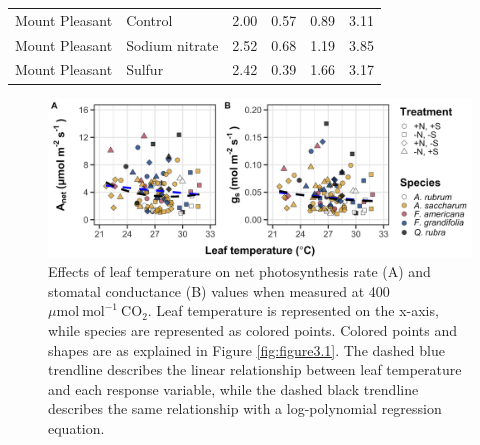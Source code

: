 \begin{landscape}
\begin{table}[]
\begin{tabular}{p{3cm}p{3.5cm}p{1.5cm}p{1.5cm}p{2.75cm}p{2.75cm}}
        Mount Pleasant & Control          & \multicolumn{1}{r}{2.00}    & \multicolumn{1}{r}{0.57}  & \multicolumn{1}{r}{0.89}          & \multicolumn{1}{r}{3.11}   \\
        Mount Pleasant & Sodium nitrate   & \multicolumn{1}{r}{2.52}    & \multicolumn{1}{r}{0.68}  & \multicolumn{1}{r}{1.19}          & \multicolumn{1}{r}{3.85}   \\
        Mount Pleasant & Sulfur           & \multicolumn{1}{r}{2.42}    & \multicolumn{1}{r}{0.39}  & \multicolumn{1}{r}{1.66}          & \multicolumn{1}{r}{3.17} \\
        \hline        
    \end{tabular}%
    \end{table}
\end{landscape}
\clearpage

\newpage
\begin{landscape}
    \begin{figure}
        \centering
        \includegraphics[width=\columnwidth]{ch3_NxpH/figs/NxS_figS1_leaftemp.jpg}
        \caption[Effects of leaf temperature on net photosynthesis rate and stomatal conductance values when measured at 400 $\mu \mathrm{mol\ mol^{-1}\ CO_2}$]{Effects of leaf temperature on net photosynthesis rate (A) and stomatal conductance (B) values when measured at 400 $\mu \mathrm{mol\ mol^{-1}\ CO_2}$. Leaf temperature is represented on the x-axis, while species are represented as colored points. Colored points and shapes are as explained in Figure \ref{fig:figure3.1}. The dashed blue trendline describes the linear relationship between leaf temperature and each response variable, while the dashed black trendline describes the same relationship with a log-polynomial regression equation.}
        \label{fig:figure.b1}
    \end{figure}
\end{landscape}
\clearpage
